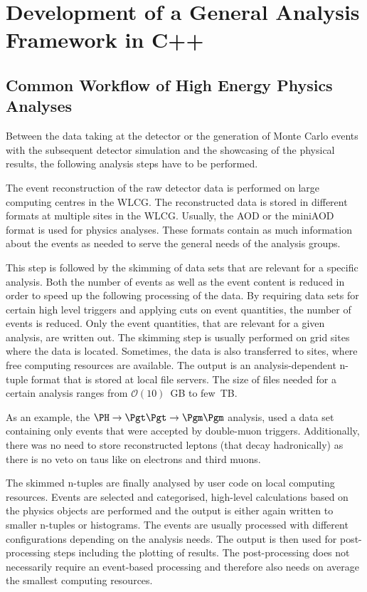 \documentclass[a4paper, oneside, 10pt]{scrartcl}
\begin{document}
\section{Development of a General Analysis Framework in C++ \label{section_artus}}

\subsection{Common Workflow of High Energy Physics Analyses \label{section_artus_analysis_workflow}}

Between the data taking at the detector or the generation of Monte Carlo events with the subsequent detector simulation and the showcasing of the physical results, the following analysis steps have to be performed.

The event reconstruction of the raw detector data is performed on large computing centres in the WLCG. The reconstructed data is stored in different formats at multiple sites in the WLCG. Usually, the AOD or the miniAOD format is used for physics analyses. These formats contain as much information about the events as needed to serve the general needs of the analysis groups.

This step is followed by the skimming of data sets that are relevant for a specific analysis. Both the number of events as well as the event content is reduced in order to speed up the following processing of the data. By requiring data sets for certain high level triggers and applying cuts on event quantities, the number of events is reduced. Only the event quantities, that are relevant for a given analysis, are written out. The skimming step is usually performed on grid sites where the data is located. Sometimes, the data is also transferred to sites, where free computing resources are available. The output is an analysis-dependent n-tuple format that is stored at local file servers. The size of files needed for a certain analysis ranges from $\mathcal O(10)$~GB to few~TB.

As an example, the $\PH\to\Pgt\Pgt\to\Pgm\Pgm$ analysis, used a data set containing only events that were accepted by double-muon triggers. Additionally, there was no need to store reconstructed \Pgt leptons (that decay hadronically) as there is no veto on taus like on electrons and third muons.

The skimmed n-tuples are finally analysed by user code on local computing resources. Events are selected and categorised, high-level calculations based on the physics objects are performed and the output is either again written to smaller n-tuples or histograms. The events are usually processed with different configurations depending on the analysis needs. The output is then used for post-processing steps including the plotting of results. The post-processing does not necessarily require an event-based processing and therefore also needs on average the smallest computing resources.
\end{document}
